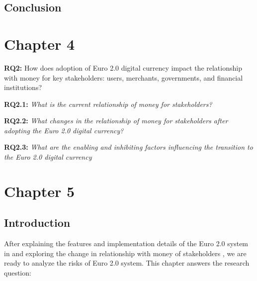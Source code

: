 \documentclass[12pt]{article} %
\newcommand{\hypernameref}[1]{\hyperref[#1]{\nameref{#1}}}
\begin{document}
{

\subsection{Conclusion} \label{ssec:3.7}


\pagebreak

\section{Chapter 4} \label{sec:4}


\begin{quoting}
	\textbf{RQ2:} How does adoption of Euro 2.0 digital currency impact the relationship with money for key stakeholders: users, merchants, governments, and financial institutions?
\end{quoting}

\begin{quoting}
	\textbf{RQ2.1: }\textit{What is the current relationship of money for stakeholders?}
\end{quoting}
\begin{quoting}
	\textbf{RQ2.2: }\textit{What changes in the relationship of money for stakeholders after adopting the Euro 2.0 digital currency?}
\end{quoting}
\begin{quoting}
	\textbf{RQ2.3: }\textit{What are the enabling and inhibiting factors influencing the transition to the Euro 2.0 digital currency}
\end{quoting}

\pagebreak

\section{Chapter 5} \label{sec:5}

\subsection{Introduction} \label{ssec:5:intro}

After explaining the features and implementation details of the Euro 2.0 system in \hypernameref{sec:3} and exploring the change in relationship with money of stakeholders \hypernameref{sec:4}, we are ready to analyze the risks of Euro 2.0 system. This chapter answers the research question:

}
\end{document}
